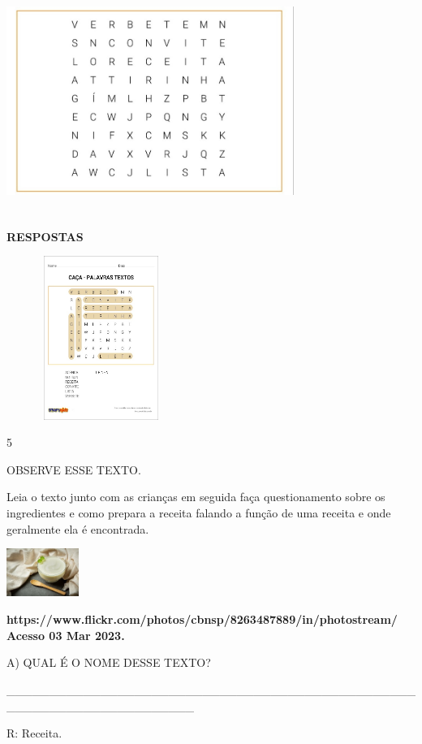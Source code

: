 {{\includegraphics[width=3.68829in,height=2.89552in]{media/image104.jpeg}

\textbf{RESPOSTAS}

\includegraphics[width=2.42537in,height=2.09849in]{media/image105.jpeg}

\num{5}

OBSERVE ESSE TEXTO.

Leia o texto junto com as crianças em seguida faça questionamento sobre
os ingredientes e como prepara a receita falando a função de uma receita
e onde geralmente ela é encontrada.

\includegraphics[width=0.92986in,height=0.61875in]{media/image106.jpeg}

\textbf{https://www.flickr.com/photos/cbnsp/8263487889/in/photostream/
Acesso 03 Mar 2023.}

A) QUAL É O NOME DESSE TEXTO?

\_\_\_\_\_\_\_\_\_\_\_\_\_\_\_\_\_\_\_\_\_\_\_\_\_\_\_\_\_\_\_\_\_\_\_\_\_\_\_\_\_\_\_\_\_\_\_\_\_\_\_\_\_\_\_\_\_\_\_\_\_\_\_\_\_\_\_\_\_\_

R: Receita.

}}
